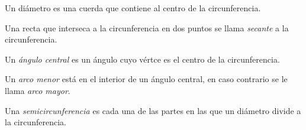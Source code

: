 \begin{definition}
    Un diámetro es una cuerda que contiene al centro de la circunferencia.

    \begin{figure}[!h]
        \centering
        
        \label{fig:diameter}
    \end{figure}
    
\end{definition}

\begin{definition}
    Una recta que interseca a la circunferencia en dos puntos se llama \textit{secante} a la circunferencia.

    \begin{figure}[!h]
        \centering
        
        \label{fig:secant}
    \end{figure}
    
\end{definition}

\clearpage

\begin{definition}
    Un \textit{ángulo central} es un ángulo cuyo vértce es el centro de la circunferencia.

    \begin{figure}[!h]
        \centering
        
        \label{fig:central-angle}
    \end{figure}
    
\end{definition}

\begin{definition}
    Un \textit{arco menor} está en el interior de un ángulo central, en caso contrario se le llama \textit{arco mayor}.

    \begin{figure}[!h]
        \centering
        
        \label{fig:arcs}
    \end{figure}
\end{definition}

\begin{definition}
    Una \textit{semicircunferencia} es cada una de las partes en las que un diámetro divide a la circunferencia.
\end{definition}

